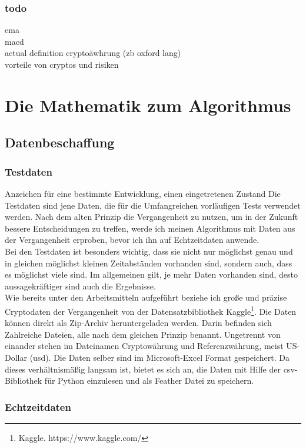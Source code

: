 \documentclass[12pt]{article}
\begin{document}
	\subsubsection{todo}
		ema \\
		macd\\
		actual definition cryptoäwhrung (zb oxford lang)\\
		vorteile von cryptos und risiken

\section{Die Mathematik zum Algorithmus}
\subsection{Datenbeschaffung}
	\subsubsection{Testdaten}
		Anzeichen für eine bestimmte Entwicklung, einen eingetretenen Zustand
		Die Testdaten sind jene Daten, die für die Umfangreichen vorläufigen Tests verwendet werden. Nach dem alten Prinzip die Vergangenheit zu nutzen, um in der Zukunft bessere Entscheidungen zu treffen, werde ich meinen Algorithmus mit Daten aus der Vergangenheit erproben, bevor ich ihn auf Echtzeitdaten anwende.\\
		Bei den Testdaten ist besonders wichtig, dass sie nicht nur möglichst genau und in gleichen möglichst kleinen Zeitabständen vorhanden sind, sondern auch, dass es möglichst viele sind. Im allgemeinen gilt, je mehr Daten vorhanden sind, desto aussagekräftiger sind auch die Ergebnisse.\\
		Wie bereits unter den Arbeitsmitteln aufgeführt beziehe ich große und präzise Cryptodaten der Vergangenheit von der Datensatzbibliothek Kaggle\footnote{Kaggle. https://www.kaggle.com/}. Die Daten können direkt als Zip-Archiv heruntergeladen werden. Darin befinden sich Zahlreiche Dateien, alle nach dem gleichen Prinzip benannt. Ungetrennt von einander stehen im Dateinamen Cryptowährung und Referenzwährung, meist US-Dollar (usd). Die Daten selber sind im Microsoft-Excel Format gespeichert. Da dieses verhältnismäßig langsam ist, bietet es sich an, die Daten mit Hilfe der csv-Bibliothek für Python einzulesen und als Feather Datei zu speichern. 
	\subsubsection{Echtzeitdaten}
\end{document}
